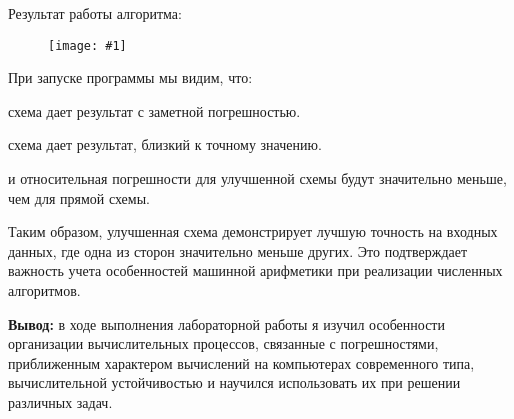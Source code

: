 \documentclass{report}
\newcommand{\drawzalupa}[2]{
	\begin{figure}[H]
		\centering
		\texttt{[image: \#1]}
	\end{figure}
}
\begin{document}
Результат работы алгоритма:

\drawzalupa{images/task4.png}{1.1}

При запуске программы мы видим, что:

\begin{itemize}
 схема дает результат с заметной погрешностью.

 схема дает результат, близкий к точному значению.

 и относительная погрешности для улучшенной схемы будут значительно меньше, чем для прямой схемы.
\end{itemize}		

Таким образом, улучшенная схема демонстрирует лучшую точность на входных данных, где одна из сторон значительно меньше других. Это подтверждает важность учета особенностей машинной арифметики при реализации численных алгоритмов. 		
	
		
	\textbf{Вывод: }в ходе выполнения лабораторной работы я изучил особенности организации вычислительных процессов, связанные с
	погрешностями, приближенным характером вычислений на компьютерах современного типа,
	вычислительной устойчивостью и научился использовать их при решении различных задач.
\end{document}
